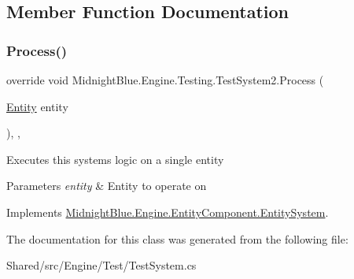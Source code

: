 \subsection{Member Function Documentation}
\hypertarget{class_midnight_blue_1_1_engine_1_1_testing_1_1_test_system2_ab8a9ea91aa5b014101ce418f66889ab0}{}\label{class_midnight_blue_1_1_engine_1_1_testing_1_1_test_system2_ab8a9ea91aa5b014101ce418f66889ab0} 
\subsubsection{\texorpdfstring{Process()}{Process()}}
{\footnotesize\ttfamily override void Midnight\+Blue.\+Engine.\+Testing.\+Test\+System2.\+Process (\begin{DoxyParamCaption}\item[{\hyperlink{class_midnight_blue_1_1_engine_1_1_entity_component_1_1_entity}{Entity}}]{entity }\end{DoxyParamCaption})\hspace{0.3cm}{\ttfamily [inline]}, {\ttfamily [protected]}, {\ttfamily [virtual]}}



Executes this systems logic on a single entity 


\begin{DoxyParams}{Parameters}
{\em entity} & Entity to operate on\\
\hline
\end{DoxyParams}


Implements \hyperlink{class_midnight_blue_1_1_engine_1_1_entity_component_1_1_entity_system_a94aa715ac6bfe9a720c3d12d56c7598c}{Midnight\+Blue.\+Engine.\+Entity\+Component.\+Entity\+System}.



The documentation for this class was generated from the following file\+:\begin{DoxyCompactItemize}
\item 
Shared/src/\+Engine/\+Test/Test\+System.\+cs\end{DoxyCompactItemize}

